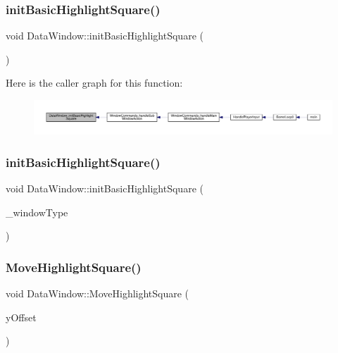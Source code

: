\subsubsection{\texorpdfstring{init\+Basic\+Highlight\+Square()}{initBasicHighlightSquare()}\hspace{0.1cm}{\footnotesize\ttfamily [1/2]}}
{\footnotesize\ttfamily void Data\+Window\+::init\+Basic\+Highlight\+Square (\begin{DoxyParamCaption}{ }\end{DoxyParamCaption})}

Here is the caller graph for this function\+:
\nopagebreak
\begin{figure}[H]
\begin{center}
\leavevmode
\includegraphics[width=350pt]{d1/def/class_data_window_afd440dc420c7fdef23a1a52f0f1b40f1_icgraph}
\end{center}
\end{figure}
\mbox{\label{class_data_window_a1b1968cd0cbaaddcae7651e57f795e0c}} 
\subsubsection{\texorpdfstring{init\+Basic\+Highlight\+Square()}{initBasicHighlightSquare()}\hspace{0.1cm}{\footnotesize\ttfamily [2/2]}}
{\footnotesize\ttfamily void Data\+Window\+::init\+Basic\+Highlight\+Square (\begin{DoxyParamCaption}\item[{\mbox{\hyperlink{_data_window_8hpp_a3c1e0c6fe947fdbea7502497b27cf44d}{En\+Data\+Window\+Type}}}]{\+\_\+window\+Type }\end{DoxyParamCaption})}

\mbox{\label{class_data_window_a2047f47dfa6093e3f7c4bf30cd176a46}} 
\subsubsection{\texorpdfstring{Move\+Highlight\+Square()}{MoveHighlightSquare()}}
{\footnotesize\ttfamily void Data\+Window\+::\+Move\+Highlight\+Square (\begin{DoxyParamCaption}\item[{int}]{y\+Offset }\end{DoxyParamCaption})}


